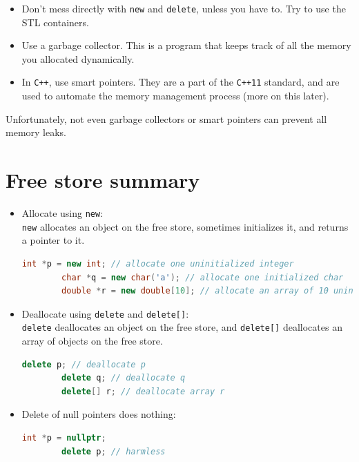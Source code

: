 \begin{itemize}
    \item Don't mess directly with \texttt{new} and \texttt{delete}, unless you have to. Try to use the STL containers.
    \item Use a garbage collector. This is a program that keeps track of all the memory you allocated dynamically.
    \item In \texttt{C++}, use smart pointers. They are a part of the \texttt{C++11} standard, and are used to automate 
    the memory management process (more on this later).
\end{itemize}

Unfortunately, not even garbage collectors or smart pointers can prevent all memory leaks.

\section{Free store summary}

\begin{itemize}
    \item Allocate using \texttt{new}:\\
    \texttt{new} allocates an object on the free store, sometimes initializes it, and returns a pointer to it.

    \begin{lstlisting}[language=C++]
        int *p = new int; // allocate one uninitialized integer
        char *q = new char('a'); // allocate one initialized char
        double *r = new double[10]; // allocate an array of 10 uninitialized doubles
    \end{lstlisting}

    \item Deallocate using \texttt{delete} and \texttt{delete[]}:\\
    \texttt{delete} deallocates an object on the free store, and \texttt{delete[]} deallocates an array of objects on the free store.

    \begin{lstlisting}[language=C++]
        delete p; // deallocate p
        delete q; // deallocate q
        delete[] r; // deallocate array r
    \end{lstlisting}

    \item Delete of null pointers does nothing:
    \begin{lstlisting}[language=C++]
        int *p = nullptr;
        delete p; // harmless
    \end{lstlisting}

\end{itemize}